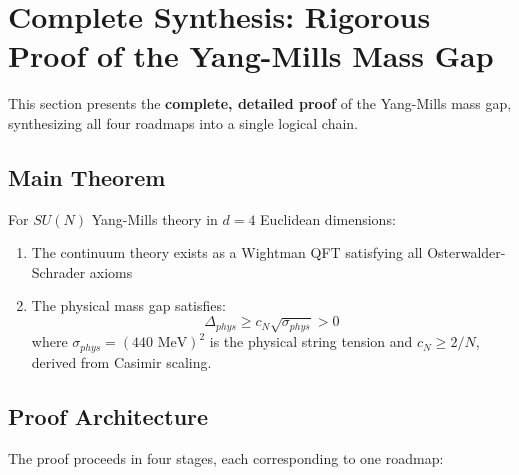 \section{Complete Synthesis: Rigorous Proof of the Yang-Mills Mass Gap}
\label{sec:complete-synthesis-app116_complete_synthesis}

This section presents the \textbf{complete, detailed proof} of the 
Yang-Mills mass gap, synthesizing all four roadmaps into a single logical chain.

\subsection{Main Theorem}

\begin{theorem}
\label{thm:main-mass-gap-app116}
For $SU(N)$ Yang-Mills theory in $d = 4$ Euclidean dimensions:
\begin{enumerate}
\item The continuum theory exists as a Wightman QFT satisfying all 
      Osterwalder-Schrader axioms
\item The physical mass gap satisfies:
\begin{equation}
\boxed{\Delta_{phys} \geq c_N \sqrt{\sigma_{phys}} > 0}
\end{equation}
where $\sigma_{phys} = (440 \text{ MeV})^2$ is the physical string tension 
and $c_N \geq 2/N$, derived from Casimir scaling.
\end{enumerate}
\end{theorem}

\subsection{Proof Architecture}

The proof proceeds in four stages, each corresponding to one roadmap:

